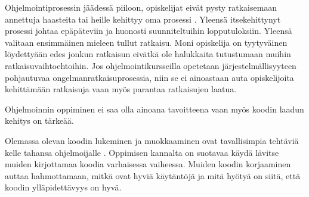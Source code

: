 Ohjelmointiprosessin jäädessä piiloon, opiskelijat eivät pysty ratkaisemaan
annettuja haasteita tai heille kehittyy oma prosessi
\cite{Caspersen:2006:NPO:1176617.1176741}. Yleensä itsekehittynyt prosessi
johtaa epäpäteviin ja huonosti suunniteltuihin lopputuloksiin. Yleensä valitaan
ensimmäinen mieleen tullut ratkaisu. Moni opiskelija on tyytyväinen löydettyään
edes jonkun ratkaisun eivätkä ole halukkaita tutustumaan muihin
ratkaisuvaihtoehtoihin. Jos ohjelmointikursseilla opetetaan
järjestelmällisyyteen pohjautuvaa ongelmanratkaisuprosessia, niin se ei
ainoastaan auta opiskelijoita kehittämään ratkaisuja vaan myös parantaa
ratkaisujen laatua.

Ohjelmoinnin oppiminen ei saa olla ainoana tavoitteena vaan myös koodin laadun
kehitys on tärkeää.

Olemassa olevan koodin lukeminen ja muokkaaminen ovat tavallisimpia tehtäviä
kelle tahansa ohjelmoijalle \cite{Kolling:2008}. Oppimisen kannalta on suotavaa
käydä lävitse muiden kirjottamaa koodia varhaisessa vaiheessa. Muiden koodin
korjaaminen auttaa hahmottamaan, mitkä ovat hyviä käytäntöjä ja mitä hyötyä on
siitä, että koodin ylläpidettävyys on hyvä.
